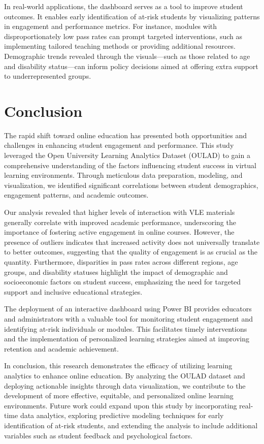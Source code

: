 In real-world applications, the dashboard serves as a tool to improve student outcomes. It enables early identification of at-risk students by visualizing patterns in engagement and performance metrics. For instance, modules with disproportionately low pass rates can prompt targeted interventions, such as implementing tailored teaching methods or providing additional resources. Demographic trends revealed through the visuals—such as those related to age and disability status—can inform policy decisions aimed at offering extra support to underrepresented groups.

\section{Conclusion}

The rapid shift toward online education has presented both opportunities and challenges in enhancing student engagement and performance. This study leveraged the Open University Learning Analytics Dataset (OULAD) to gain a comprehensive understanding of the factors influencing student success in virtual learning environments. Through meticulous data preparation, modeling, and visualization, we identified significant correlations between student demographics, engagement patterns, and academic outcomes.

Our analysis revealed that higher levels of interaction with VLE materials generally correlate with improved academic performance, underscoring the importance of fostering active engagement in online courses. However, the presence of outliers indicates that increased activity does not universally translate to better outcomes, suggesting that the quality of engagement is as crucial as the quantity. Furthermore, disparities in pass rates across different regions, age groups, and disability statuses highlight the impact of demographic and socioeconomic factors on student success, emphasizing the need for targeted support and inclusive educational strategies.

The deployment of an interactive dashboard using Power BI provides educators and administrators with a valuable tool for monitoring student engagement and identifying at-risk individuals or modules. This facilitates timely interventions and the implementation of personalized learning strategies aimed at improving retention and academic achievement.

In conclusion, this research demonstrates the efficacy of utilizing learning analytics to enhance online education. By analyzing the OULAD dataset and deploying actionable insights through data visualization, we contribute to the development of more effective, equitable, and personalized online learning environments. Future work could expand upon this study by incorporating real-time data analytics, exploring predictive modeling techniques for early identification of at-risk students, and extending the analysis to include additional variables such as student feedback and psychological factors.


